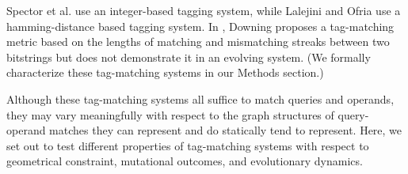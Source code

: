 Spector et al. use an integer-based tagging system, while Lalejini and Ofria use a hamming-distance based tagging system.
In \citep{downing2015intelligence}, Downing proposes a tag-matching metric based on the lengths of matching and mismatching streaks between two bitstrings but does not demonstrate it in an evolving system.
(We formally characterize these tag-matching systems in our Methods section.)

Although these tag-matching systems all suffice to match queries and operands, they may vary meaningfully with respect to the graph structures of query-operand matches they can represent and do statically tend to represent.
Here, we set out to test different properties of tag-matching systems with respect to geometrical constraint, mutational outcomes, and evolutionary dynamics.


%



